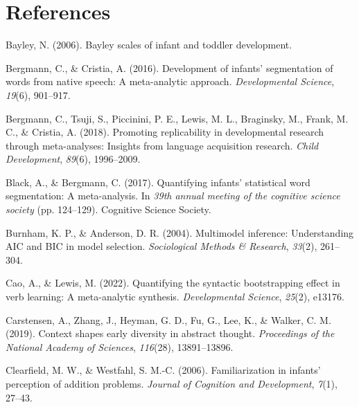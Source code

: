 \documentclass[10pt, letterpaper]{article}
\newenvironment{CSLReferences}%
  {}%
  {\par}
\begin{document}
\hypertarget{references}{%
\section{References}\label{references}}

\setlength{\parindent}{-0.1in} 
\setlength{\leftskip}{0.125in}

\noindent

\hypertarget{refs}{}
\begin{CSLReferences}{1}{0}
\leavevmode{}%
Bayley, N. (2006). Bayley scales of infant and toddler development.

\leavevmode{}%
Bergmann, C., \& Cristia, A. (2016). Development of infants'
segmentation of words from native speech: A meta-analytic approach.
\emph{Developmental Science}, \emph{19}(6), 901--917.

\leavevmode{}%
Bergmann, C., Tsuji, S., Piccinini, P. E., Lewis, M. L., Braginsky, M.,
Frank, M. C., \& Cristia, A. (2018). Promoting replicability in
developmental research through meta-analyses: Insights from language
acquisition research. \emph{Child Development}, \emph{89}(6),
1996--2009.

\leavevmode{}%
Black, A., \& Bergmann, C. (2017). Quantifying infants' statistical word
segmentation: A meta-analysis. In \emph{39th annual meeting of the
cognitive science society} (pp. 124--129). Cognitive Science Society.

\leavevmode{}%
Burnham, K. P., \& Anderson, D. R. (2004). Multimodel inference:
Understanding AIC and BIC in model selection. \emph{Sociological Methods
\& Research}, \emph{33}(2), 261--304.

\leavevmode{}%
Cao, A., \& Lewis, M. (2022). Quantifying the syntactic bootstrapping
effect in verb learning: A meta-analytic synthesis. \emph{Developmental
Science}, \emph{25}(2), e13176.

\leavevmode{}%
Carstensen, A., Zhang, J., Heyman, G. D., Fu, G., Lee, K., \& Walker, C.
M. (2019). Context shapes early diversity in abstract thought.
\emph{Proceedings of the National Academy of Sciences}, \emph{116}(28),
13891--13896.

\leavevmode{}%
Clearfield, M. W., \& Westfahl, S. M.-C. (2006). Familiarization in
infants' perception of addition problems. \emph{Journal of Cognition and
Development}, \emph{7}(1), 27--43.


\end{CSLReferences}
\end{document}
